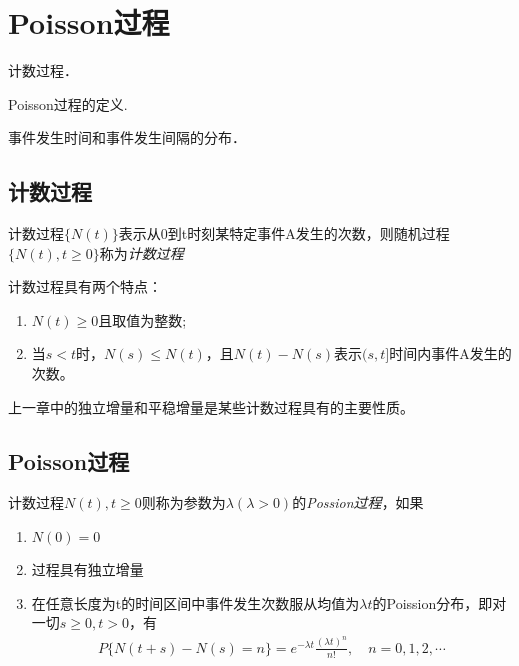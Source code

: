 
\chapter{Poisson过程}

\begin{compactitem}
	\item 计数过程．
	\item Poisson过程的定义.
	\item 事件发生时间和事件发生间隔的分布．
\end{compactitem}

\section{计数过程}\label{sec:CounProc}

\begin{definition}\label{def:cont-proc}
	计数过程\(\{N(t)\}\)表示从0到t时刻某特定事件A发生的次数，则随机过程\(\{N(t),t\geqslant 0\}\)称为\emph{计数过程}
\end{definition}

计数过程具有两个特点：
\begin{enumerate}[\bfseries (1)]
	\item \(N(t)\geqslant 0\)且取值为整数;
	\item 当\(s<t\)时，\(N(s)\leqslant N(t)\)，且\(N(t)-N(s)\)表示\((s,t]\)时间内事件A发生的次数。
\end{enumerate}

上一章中的独立增量和平稳增量是某些计数过程具有的主要性质。

\section{Poisson过程}


\begin{definition}\label{def:Pois-Proc}
	计数过程\(N(t),t\geqslant 0\)则称为参数为\(\lambda (\lambda >0 )\)的\emph{Possion过程}，如果
	\begin{enumerate}[\bfseries (1)]
		\item \(N(0)=0\)
		\item 过程具有独立增量
		\item 在任意长度为t的时间区间中事件发生次数服从均值为\(\lambda t\)的Poission分布，即对一切\(s\geqslant 0,t>0\)，有\begin{align*}P\{N(t+s)-N(s)=n\}=e^{-\lambda t}\frac{(\lambda t)^n}{n!},\quad n=0,1,2,\cdots\end{align*}
	\end{enumerate}
\end{definition}

